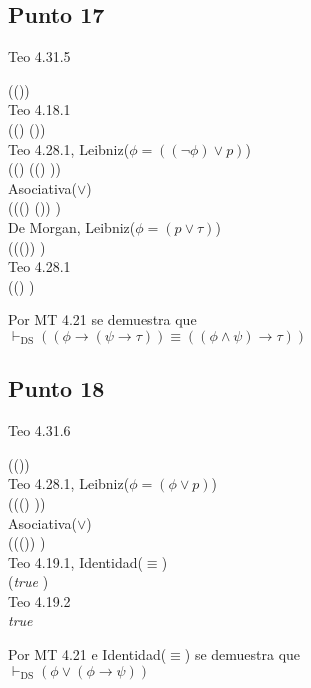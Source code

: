 \documentclass{article}
\begin{document}
\subsection{Punto 17}
\begin{logicenv}{Teo 4.31.5}
    \begin{derivation}
            (\phi \to (\psi \to \tau))\\
        Teo 4.18.1\\
            ((\neg \phi) \lor (\psi \to \tau))\\
        Teo 4.28.1, Leibniz($\phi = ((\neg \phi) \lor p)$)\\
            ((\neg \phi) \lor ((\neg \psi) \lor \tau))\\
        Asociativa($\lor$)\\
            (((\neg \phi) \lor (\neg \psi)) \lor \tau)\\
        De Morgan, Leibniz($\phi = (p \lor \tau)$)\\
            ((\neg (\phi \land \psi)) \lor \tau)\\
        Teo 4.28.1\\
            ((\phi \land \psi) \to \tau)
    \end{derivation}
    Por MT 4.21 se demuestra que\\
    $\vdash_{\text{DS}} ((\phi \to (\psi \to \tau)) \equiv ((\phi \land \psi) \to \tau))$
\end{logicenv}

\subsection{Punto 18}
\begin{logicenv}{Teo 4.31.6}
    \begin{derivation}
        (\phi \lor (\phi \to \psi))\\
    Teo 4.28.1, Leibniz($\phi = (\phi \lor p)$)\\
        (\phi \lor ((\neg \phi) \lor \psi))\\
    Asociativa($\lor$)\\
        ((\phi \lor (\neg \phi)) \lor \psi)\\
    Teo 4.19.1, Identidad($\equiv$)\\
        (\textrm{\textit{true}} \lor \psi)\\
    Teo 4.19.2\\
        \textrm{\textit{true}}
    \end{derivation}
    Por MT 4.21 e Identidad($\equiv$) se demuestra que\\
    $\vdash_{\text{DS}} (\phi \lor (\phi \to \psi))$
\end{logicenv}
\end{document}
